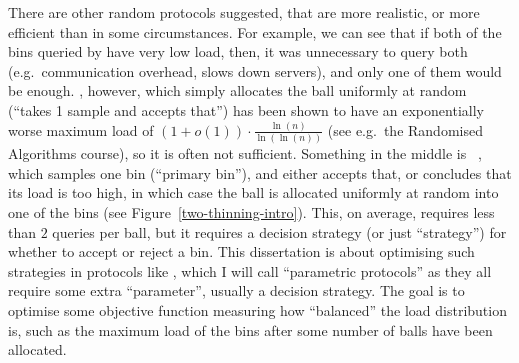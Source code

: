 There are other random protocols suggested, that are more realistic, or more efficient than \TwoChoice in some circumstances. For example, we can see that if both of the bins queried by \TwoChoice have very low load, then, it was unnecessary to query both (e.g.\ communication overhead, slows down servers), and only one of them would be enough. \OneChoice, however, which simply allocates the ball uniformly at random (``takes 1 sample and accepts that'') has been shown to have an exponentially worse maximum load of $(1+o(1))\cdot \frac{\ln(n)}{\ln(\ln(n))}$ (see e.g.\ the Randomised Algorithms course), so it is often not sufficient. Something in the middle is \TwoThinning~\cite{feldheim2021thinning}, which samples one bin (``primary bin''), and either accepts that, or concludes that its load is too high, in which case the ball is allocated uniformly at random into one of the bins (see Figure~\ref{two-thinning-intro}). This, on average, requires less than $2$ queries per ball, but it requires a decision strategy (or just ``strategy'') for whether to accept or reject a bin. This dissertation is about optimising such strategies in protocols like \TwoThinning, which I will call ``parametric protocols'' as they all require some extra ``parameter'', usually a decision strategy. The goal is to optimise some objective function measuring how ``balanced'' the load distribution is, such as the maximum load of the bins after some number of balls have been allocated.



